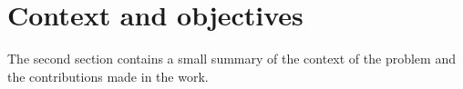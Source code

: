 \chapter{Context and objectives}
\label{cha:contri}
The second section contains a small summary of the context of the problem and the contributions made in the work.